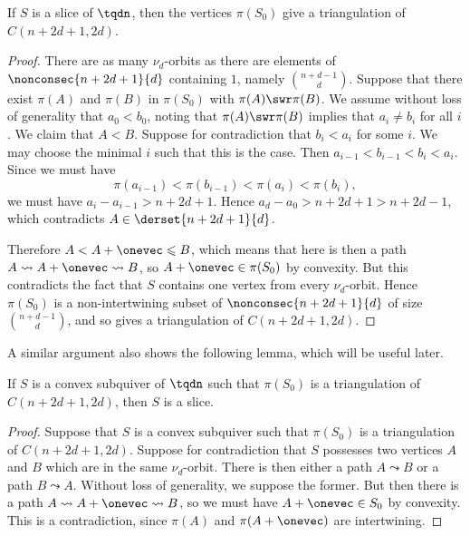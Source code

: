 \begin{prop}\label{prop:slice->triang}
If $S$ is a slice of $\tqdn$, then the vertices $\pi(S_{0})$ give a triangulation of $C(n + 2d + 1, 2d)$.
\end{prop}
\begin{proof}
There are as many $\nu_{d}$-orbits as there are elements of $\nonconsec{n + 2d + 1}{d}$ containing $1$, namely $\binom{n + d - 1}{d}$. Suppose that there exist $\pi(A)$ and $\pi(B)$ in $\pi(S_{0})$ with $\pi(A) \swr \pi(B)$. We assume without loss of generality that $a_{0} < b_{0}$, noting that $\pi(A) \swr \pi(B)$ implies that $a_{i} \neq b_{i}$ for all $i$. We claim that $A < B$. Suppose for contradiction that $b_{i} < a_{i}$ for some $i$. We may choose the minimal $i$ such that this is the case. Then $a_{i - 1} < b_{i - 1} < b_{i} < a_{i}$. Since we must have \[\pi(a_{i - 1}) < \pi(b_{i - 1}) < \pi(a_{i}) < \pi(b_{i}),\] we must have $a_{i} - a_{i - 1} > n + 2d + 1$. Hence $a_{d} - a_{0} > n + 2d + 1 > n + 2d - 1$, which contradicts $A \in \derset{n + 2d + 1}{d}$.

Therefore $A < A + \onevec \leqslant B$, which means that here is then a path $A \leadsto A + \onevec \leadsto B$, so $A + \onevec \in \pi(S_{0})$ by convexity. But this contradicts the fact that $S$ contains one vertex from every $\nu_{d}$-orbit. Hence $\pi(S_{0})$ is a non-intertwining subset of $\nonconsec{n + 2d + 1}{d}$ of size $\binom{n + d - 1}{d}$, and so gives a triangulation of $C(n + 2d + 1, 2d)$.
\end{proof}

A similar argument also shows the following lemma, which will be useful later.

\begin{lemma}\label{lem:conv->slice}
If $S$ is a convex subquiver of $\tqdn$ such that $\pi(S_{0})$ is a triangulation of $C(n+2d+1,2d)$, then $S$ is a slice. 
\end{lemma}
\begin{proof}
Suppose that $S$ is a convex subquiver such that $\pi(S_{0})$ is a triangulation of $C(n + 2d + 1, 2d)$. Suppose for contradiction that $S$ possesses two vertices $A$ and $B$ which are in the same $\nu_{d}$-orbit. There is then either a path $A \leadsto B$ or a path $B \leadsto A$. Without loss of generality, we suppose the former. But then there is a path $A \leadsto A + \onevec \leadsto B$, so we must have $A + \onevec \in S_{0}$ by convexity. This is a contradiction, since $\pi(A)$ and $\pi(A + \onevec)$ are intertwining.
\end{proof}

